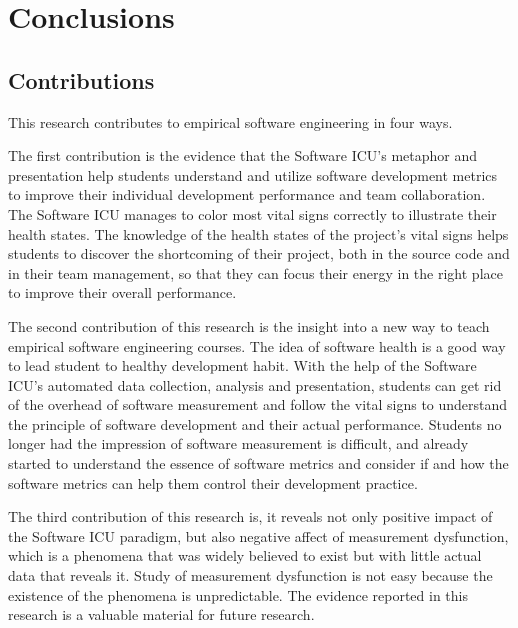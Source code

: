 \chapter{Conclusions}

\section{Contributions}
This research contributes to empirical software engineering in four ways.

The first contribution is the evidence that the Software ICU's metaphor and presentation help students understand and utilize software development metrics to improve their individual development performance and team collaboration. The Software ICU manages to color most vital signs correctly to illustrate their health states. The knowledge of the health states of the project's vital signs helps students to discover the shortcoming of their project, both in the source code and in their team management, so that they can focus their energy in the right place to improve their overall performance. 

The second contribution of this research is the insight into a new way to teach empirical software engineering courses. The idea of software health is a good way to lead student to healthy development habit. With the help of the Software ICU's automated data collection, analysis and presentation, students can get rid of the overhead of software measurement and follow the vital signs to understand the principle of software development and their actual performance. Students no longer had the impression of software measurement is difficult, and already started to understand the essence of software metrics and consider if and how the software metrics can help them control their development practice.

The third contribution of this research is, it reveals not only positive impact of the Software ICU paradigm, but also negative affect of measurement dysfunction, which is a phenomena that was widely believed to exist but with little actual data that reveals it. Study of measurement dysfunction is not easy because the existence of the phenomena is unpredictable. The evidence reported in this research is a valuable material for future research.

